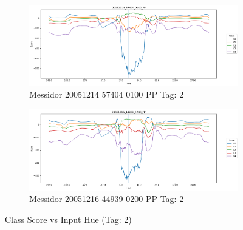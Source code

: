 \begin{figure}[ht!]
	\begin{subfigure}[b]{ 0.85\textwidth}
		\centering
		\includegraphics[width=\textwidth]{Figures/chapter_stability/20051214_57404_0100_PP/h/scores.png}
		\caption{Messidor 20051214 57404 0100 PP Tag: 2}		
	\end{subfigure}	
	\begin{subfigure}[b]{ 0.85\textwidth}
		\centering
		\includegraphics[width=\textwidth]{Figures/chapter_stability/20051216_44939_0200_PP/h/scores.png}
		\caption{Messidor 20051216 44939 0200 PP Tag: 2}		
	\end{subfigure}
	\hfill 
	\caption[Score vs Hue (Tag: 2)]{Class Score vs Input Hue (Tag: 2)}  
	\label{sta:fig:hue2} 
\end{figure}

